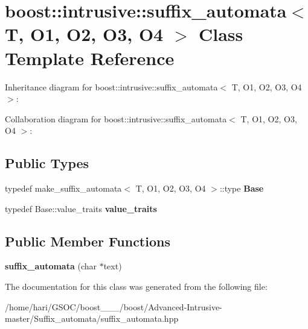 \hypertarget{classboost_1_1intrusive_1_1suffix__automata}{}\section{boost\+:\+:intrusive\+:\+:suffix\+\_\+automata$<$ T, O1, O2, O3, O4 $>$ Class Template Reference}
\label{classboost_1_1intrusive_1_1suffix__automata}


Inheritance diagram for boost\+:\+:intrusive\+:\+:suffix\+\_\+automata$<$ T, O1, O2, O3, O4 $>$\+:


Collaboration diagram for boost\+:\+:intrusive\+:\+:suffix\+\_\+automata$<$ T, O1, O2, O3, O4 $>$\+:
\subsection*{Public Types}
\begin{DoxyCompactItemize}
\item 
\mbox{\label{classboost_1_1intrusive_1_1suffix__automata_af5152d681de2ae59737825d5b2c2b027}} 
typedef make\+\_\+suffix\+\_\+automata$<$ T, O1, O2, O3, O4 $>$\+::type {\bfseries Base}
\item 
\mbox{\label{classboost_1_1intrusive_1_1suffix__automata_a159d8fbab457d5f8aae6ebb5a98b18c2}} 
typedef Base\+::value\+\_\+traits {\bfseries value\+\_\+traits}
\end{DoxyCompactItemize}
\subsection*{Public Member Functions}
\begin{DoxyCompactItemize}
\item 
\mbox{\label{classboost_1_1intrusive_1_1suffix__automata_a671eee511bab2df95ef036be104dcefa}} 
{\bfseries suffix\+\_\+automata} (char $\ast$text)
\end{DoxyCompactItemize}


The documentation for this class was generated from the following file\+:\begin{DoxyCompactItemize}
\item 
/home/hari/\+G\+S\+O\+C/boost\+\_\+\_\+\_/boost/\+Advanced-\/\+Intrusive-\/master/\+Suffix\+\_\+automata/suffix\+\_\+automata.\+hpp\end{DoxyCompactItemize}
